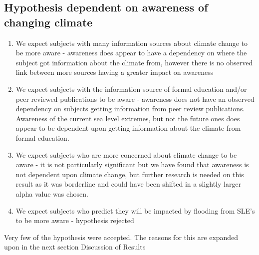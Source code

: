 \subsection{Hypothesis dependent on awareness of changing climate}
\begin{enumerate}
    \item We expect subjects with many information sources about climate change to be more aware - awareness does appear to have a dependency on where the subject got information about the climate from, however there is no observed link between more sources having a greater impact on awareness
    \item We expect subjects with the information source of formal education and/or peer reviewed publications to be aware - awareness does not have an observed dependency on subjects getting information from peer review publications. Awareness of the current sea level extremes, but not the future ones does appear to be dependent upon getting information about the climate from formal education.  
    \item We expect subjects who are more concerned about climate change to be aware - it is not particularly significant but we have found that awareness is not dependent upon climate change, but further research is needed on this result as it was borderline and could have been shifted in a slightly larger alpha value was chosen.
    \item We expect subjects who predict they will be impacted by flooding from SLE's to be more aware - hypothesis rejected
\end{enumerate}

Very few of the hypothesis were accepted. The reasons for this are expanded upon in the next section Discussion of Results
